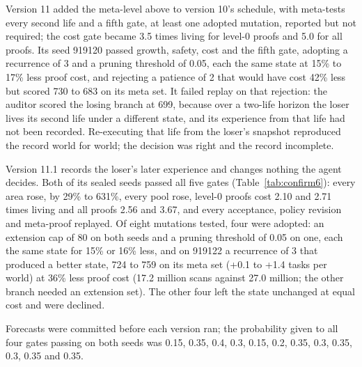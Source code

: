 \documentclass[11pt]{article}
\begin{document}
Version 11 added the meta-level above to version 10's schedule, with meta-tests every second life and a fifth gate, at least one adopted mutation, reported but not required; the cost gate became 3.5 times living for level-0 proofs and 5.0 for all proofs. Its seed 919120 passed growth, safety, cost and the fifth gate, adopting a recurrence of 3 and a pruning threshold of 0.05, each the same state at 15\% to 17\% less proof cost, and rejecting a patience of 2 that would have cost 42\% less but scored 730 to 683 on its meta set. It failed replay on that rejection: the auditor scored the losing branch at 699, because over a two-life horizon the loser lives its second life under a different state, and its experience from that life had not been recorded. Re-executing that life from the loser's snapshot reproduced the record world for world; the decision was right and the record incomplete.

Version 11.1 records the loser's later experience and changes nothing the agent decides. Both of its sealed seeds passed all five gates (Table~\ref{tab:confirm6}): every area rose, by 29\% to 631\%, every pool rose, level-0 proofs cost 2.10 and 2.71 times living and all proofs 2.56 and 3.67, and every acceptance, policy revision and meta-proof replayed. Of eight mutations tested, four were adopted: an extension cap of 80 on both seeds and a pruning threshold of 0.05 on one, each the same state for 15\% or 16\% less, and on 919122 a recurrence of 3 that produced a better state, 724 to 759 on its meta set (+0.1 to +1.4 tasks per world) at 36\% less proof cost (17.2 million scans against 27.0 million; the other branch needed an extension set). The other four left the state unchanged at equal cost and were declined.

Forecasts were committed before each version ran; the probability given to all four gates passing on both seeds was 0.15, 0.35, 0.4, 0.3, 0.15, 0.2, 0.35, 0.3, 0.35, 0.3, 0.35 and 0.35.
\end{document}
